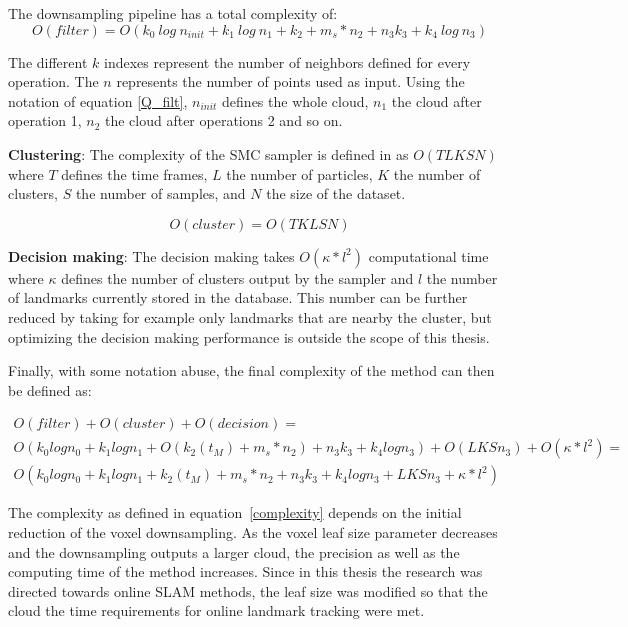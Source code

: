 \documentclass [twoside,hidelinks]{article}
\begin{document}
The downsampling pipeline has a total complexity of:
\begin{equation} \label{Q_filt}
O (filter) = O (k_{0}\ log\ n_{init} + k_{1}\ log\ n_{1} + k_{2}+ m_s*n_{2} + n_{3}k_{3} + k_{4}\ log\ n_{3} )
\end{equation}

The different $k$ indexes represent the number of neighbors defined for every operation. The $n$ represents the number of points used as input. Using the notation of equation \ref{Q_filt}, $n_{init}$ defines the whole cloud, $n_1$ the cloud after operation 1, $n_2$ the cloud after operations 2 and so on.

\textbf{Clustering}: The complexity of the SMC sampler is defined in \cite{smcddp} as $O (TLKSN)$ where $T$ defines the time frames, $L$ the number of particles, $K$ the number of clusters, $S$ the number of samples, and $N$ the size of the dataset. 

$$
O (cluster) = O (TKLSN)
$$

\textbf{Decision making}: The decision making takes $ O (\kappa * l^2) $ computational time where $\kappa$ defines the number of clusters output by the sampler and $l$ the number of landmarks currently stored in the database. This number can be further reduced by taking for example only landmarks that are nearby the cluster, but optimizing the decision making performance is outside the scope of this thesis.


Finally, with some notation abuse, the final complexity of the method can then be defined as:

\begin{equation} \label{complexity}
\begin{split}
O (filter) + O (cluster) + O (decision) = \\
O (k_{0}logn_{0} + k_{1}logn_{1} + O (k_{2} (t_M)+ m_s*n_{2}) + n_{3}k_{3} + k_{4}logn_{3} ) + O (LKSn_3) + O (\kappa * l^2)=\\
O (k_{0}logn_{0} + k_{1}logn_{1} + k_{2} (t_M)+ m_s*n_{2} + n_{3}k_{3} + k_{4}logn_{3} + LKSn_3 + \kappa * l^2)
\end{split}
\end{equation}

The complexity as defined in equation~\ref{complexity} depends on the initial reduction of the voxel downsampling. As the voxel leaf size parameter decreases and the downsampling outputs a larger cloud, the precision as well as the computing time of the method increases. Since in this thesis the research was directed towards online SLAM methods, the leaf size was modified so that the cloud the time requirements for online landmark tracking were met.
\end{document}
